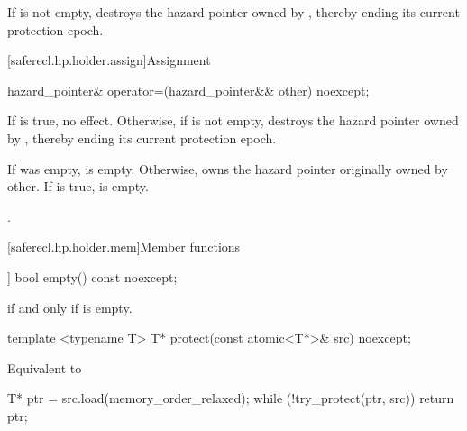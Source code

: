 \begin{itemdescr}

\effects 
If  is not empty, destroys the hazard pointer owned by , thereby ending its current protection epoch.

\end{itemdescr}

[saferecl.hp.holder.assign]{Assignment}

\begin{itemdecl}
hazard_pointer& operator=(hazard_pointer&& other) noexcept;
\end{itemdecl}

\begin{itemdescr}

\effects 
If  is true, no effect. Otherwise, if  is not empty, destroys
the hazard pointer owned by , thereby ending its current protection epoch.

\ensures 
If  was empty,  is empty. Otherwise,  owns the hazard
pointer originally owned by other. If  is true,  is empty.

\returns 
{}.

\end{itemdescr}

[saferecl.hp.holder.mem]{Member functions}

\begin{itemdecl}
[[nodiscard]] bool empty() const noexcept;
\end{itemdecl}

\begin{itemdescr}

\returns 
{} if and only if  is empty.

\end{itemdescr}


\begin{itemdecl}
template <typename T> T* protect(const atomic<T*>& src) noexcept;
\end{itemdecl}

\begin{itemdescr}

\effects 
Equivalent to
\begin{codeblock}
T* ptr = src.load(memory_order_relaxed);
while (!try_protect(ptr, src)) {}
return ptr;
\end{codeblock}

\end{itemdescr}

